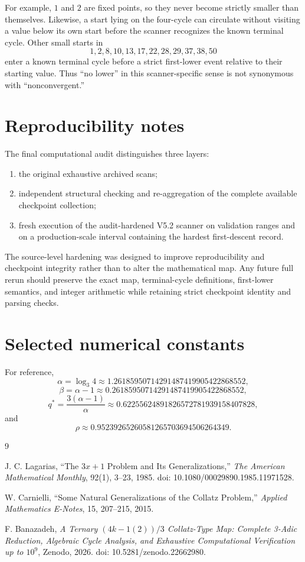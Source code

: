 \documentclass[11pt]{article}
\theoremstyle{definition}
\theoremstyle{remark}
\begin{document}
For example, $1$ and $2$ are fixed points, so they never become strictly smaller than themselves.  Likewise, a start lying on the four-cycle can circulate without visiting a value below its own start before the scanner recognizes the known terminal cycle.  Other small starts in
\[
1,2,8,10,13,17,22,28,29,37,38,50
\]
enter a known terminal cycle before a strict first-lower event relative to their starting value.  Thus ``no lower'' in this scanner-specific sense is not synonymous with ``nonconvergent.''

\section{Reproducibility notes}

The final computational audit distinguishes three layers:

\begin{enumerate}[leftmargin=2em]
\item the original exhaustive archived scans;
\item independent structural checking and re-aggregation of the complete available checkpoint collection;
\item fresh execution of the audit-hardened V5.2 scanner on validation ranges and on a production-scale interval containing the hardest first-descent record.
\end{enumerate}

The source-level hardening was designed to improve reproducibility and checkpoint integrity rather than to alter the mathematical map.  Any future full rerun should preserve the exact map, terminal-cycle definitions, first-lower semantics, and integer arithmetic while retaining strict checkpoint identity and parsing checks.

\section{Selected numerical constants}

For reference,
\[
\alpha=\log_3 4
\approx
1.26185950714291487419905422868552,
\]
\[
\beta=\alpha-1
\approx
0.26185950714291487419905422868552,
\]
\[
q^\ast
=
\frac{3(\alpha-1)}{\alpha}
\approx
0.62255624891826572781939158407828,
\]
and
\[
\rho
\approx
0.95239265260581265703694506264349.
\]

\begin{thebibliography}{9}\sloppy

J. C. Lagarias,
``The $3x+1$ Problem and Its Generalizations,''
\emph{The American Mathematical Monthly},
92(1), 3--23, 1985.
doi: 10.1080/00029890.1985.11971528.

W. Carnielli,
``Some Natural Generalizations of the Collatz Problem,''
\emph{Applied Mathematics E-Notes},
15, 207--215, 2015.

F. Banazadeh,
\emph{A Ternary $(4k-1(2))/3$ Collatz-Type Map: Complete 3-Adic Reduction,
Algebraic Cycle Analysis, and Exhaustive Computational Verification up to $10^9$},
Zenodo, 2026.
doi: 10.5281/zenodo.22662980.

\end{thebibliography}
\end{document}
